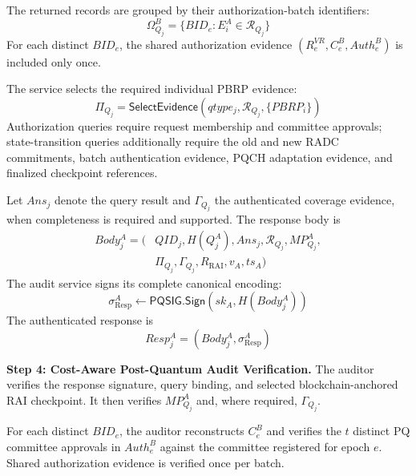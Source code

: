 \documentclass[lettersize,journal]{IEEEtran}
\begin{document}
    The returned records are grouped by
    their authorization-batch identifiers:
    \begin{equation}
    \Omega_{Q_j}^B=
    \{BID_e:E_i^A\in\mathcal{R}_{Q_j}\}
    \end{equation}
    For each distinct $BID_e$, the shared
    authorization evidence
    $(R_e^{VR},C_e^B,Auth_e^B)$ is included
    only once.
    
    The service selects the required
    individual PBRP evidence:
    \begin{equation}
    \Pi_{Q_j}=
    \mathsf{SelectEvidence}
    (qtype_j,\mathcal{R}_{Q_j},
    \{PBRP_i\})
    \end{equation}
    Authorization queries require request
    membership and committee approvals;
    state-transition queries additionally
    require the old and new RADC commitments,
    batch authentication evidence, PQCH
    adaptation evidence, and finalized
    checkpoint references.
    
    Let $Ans_j$ denote the query result and
    $\Gamma_{Q_j}$ the authenticated coverage
    evidence, when completeness is required
    and supported. The response body is
    \begin{equation}
    \begin{aligned}
    Body_j^A=\big(
    &QID_j,H(Q_j^A),Ans_j,
    \mathcal{R}_{Q_j},MP_{Q_j}^A,\\
    &\Pi_{Q_j},
    \Gamma_{Q_j},R_{\mathrm{RAI}},v_A,ts_A\big)
    \end{aligned}
    \end{equation}
    The audit service signs its complete
    canonical encoding:
    \begin{equation}
    \sigma_{\mathrm{Resp}}^A
    \leftarrow
    \mathsf{PQSIG.Sign}
    (sk_A,H(Body_j^A))
    \end{equation}
    The authenticated response is
    \begin{equation}
    Resp_j^A=
    (Body_j^A,\sigma_{\mathrm{Resp}}^A)
    \end{equation}
    
    \medskip
    \noindent\textbf{Step 4: Cost-Aware
    Post-Quantum Audit Verification.}
    The auditor verifies the response
    signature, query binding, and selected
    blockchain-anchored RAI checkpoint.
    It then verifies $MP_{Q_j}^A$ and,
    where required, $\Gamma_{Q_j}$.
    
    For each distinct $BID_e$, the auditor
    reconstructs $C_e^B$ and verifies
    the $t$ distinct PQ committee approvals
    in $Auth_e^B$ against the committee
    registered for epoch $e$. Shared
    authorization evidence is verified
    once per batch.
    
\end{document}

